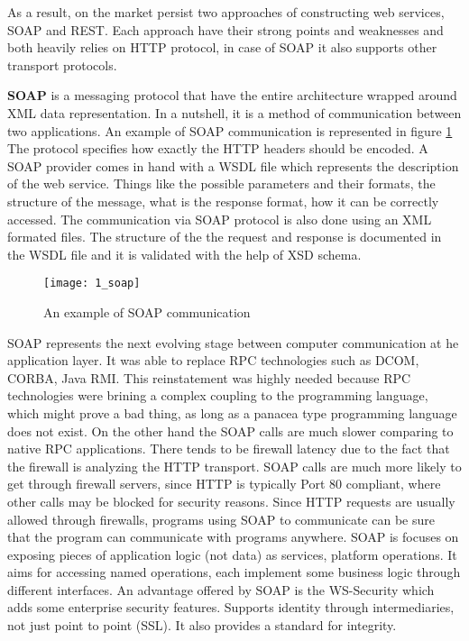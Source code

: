 As a result, on the market persist two approaches of constructing web services, SOAP and REST. Each approach have their strong points and weaknesses and both heavily relies on HTTP protocol, in case of SOAP it also supports other transport protocols.

\textbf{SOAP} is a messaging protocol that have the entire architecture wrapped around XML data representation. In a nutshell, it is a method of communication between two applications. An example of SOAP communication is represented in figure \mbox{\ref{soap}} The protocol specifies how exactly the HTTP headers should be encoded. A SOAP provider comes in hand with a WSDL file which represents the description of the web service. Things like the possible parameters and their formats, the structure of the message, what is the response format, how it can be correctly accessed. The communication via SOAP protocol is also done using an XML formated files. The structure of the the request and response is documented in the WSDL file and it is validated with the help of XSD schema.

\begin{figure}[!ht]
\centering
\texttt{[image: 1\_soap]}
\caption{An example of SOAP communication}\label{soap}
\end{figure}


SOAP represents the next evolving stage between computer communication at he application layer. It was able to replace RPC technologies such as DCOM, CORBA, Java RMI. This reinstatement was highly needed because RPC technologies were brining a complex coupling to the programming language, which might prove a bad thing, as long as a panacea type programming language does not exist. On the other hand the SOAP calls are much slower comparing to native RPC applications. There tends to be firewall latency due to the fact that the firewall is analyzing the HTTP transport. SOAP calls are much more likely to get through firewall servers, since HTTP is typically Port 80 compliant, where other calls may be blocked for security reasons. Since HTTP requests are usually allowed through firewalls, programs using SOAP to communicate can be sure that the program can communicate with programs anywhere. SOAP is focuses on exposing pieces of application logic (not data) as services, platform operations. It aims for accessing named operations, each implement some business logic through different interfaces. An advantage offered by SOAP is the WS-Security which adds some enterprise security features. Supports identity through intermediaries, not just point to point (SSL). It also provides a standard for integrity.

